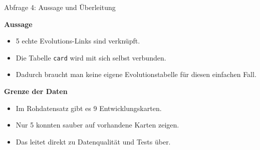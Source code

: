\documentclass[aspectratio=169,11pt]{beamer}
\begin{document}
\begin{frame}{Abfrage 4: Aussage und \"Uberleitung}
  \begin{minipage}[t]{0.48\textwidth}
    \begin{panel}[colback=softgreen,colframe=green!40,height=5.2cm]
      {\bfseries Aussage}\par
      \begin{itemize}
        \item 5 echte Evolutions-Links sind verkn\"upft.
        \item Die Tabelle \texttt{card} wird mit sich selbst verbunden.
        \item Dadurch braucht man keine eigene Evolutionstabelle f\"ur diesen einfachen Fall.
      \end{itemize}
    \end{panel}
  \end{minipage}\hfill
  \begin{minipage}[t]{0.48\textwidth}
    \begin{panel}[colback=softred,colframe=accent!40,height=5.2cm]
      {\bfseries Grenze der Daten}\par
      \begin{itemize}
        \item Im Rohdatensatz gibt es 9 Entwicklungskarten.
        \item Nur 5 konnten sauber auf vorhandene Karten zeigen.
        \item Das leitet direkt zu Datenqualit\"at und Tests \"uber.
      \end{itemize}
    \end{panel}
  \end{minipage}
\end{frame}
\end{document}
